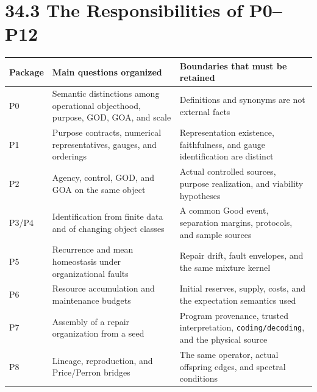 \documentclass[
  english,
  11pt,
  oneside]{book}
\newcounter{none} %
\begin{document}
\section{34.3 The Responsibilities of P0--P12}\label{the-responsibilities-of-p0p12}

{\def\LTcaptype{none} %
\begin{longtable}[]{@{}
  >{\raggedright\arraybackslash}p{}
  >{\raggedright\arraybackslash}p{}
  >{\raggedright\arraybackslash}p{}@{}}
\toprule\noalign{}
\begin{minipage}[b]{\linewidth}\raggedright
Package
\end{minipage} & \begin{minipage}[b]{\linewidth}\raggedright
Main questions organized
\end{minipage} & \begin{minipage}[b]{\linewidth}\raggedright
Boundaries that must be retained
\end{minipage} \\
\midrule\noalign{}
\endhead
\bottomrule\noalign{}
\endlastfoot
P0 & Semantic distinctions among operational objecthood, purpose, GOD, GOA, and scale & Definitions and synonyms are not external facts \\
P1 & Purpose contracts, numerical representatives, gauges, and orderings & Representation existence, faithfulness, and gauge identification are distinct \\
P2 & Agency, control, GOD, and GOA on the same object & Actual controlled sources, purpose realization, and viability hypotheses \\
P3/P4 & Identification from finite data and of changing object classes & A common Good event, separation margins, protocols, and sample sources \\
P5 & Recurrence and mean homeostasis under organizational faults & Repair drift, fault envelopes, and the same mixture kernel \\
P6 & Resource accumulation and maintenance budgets & Initial reserves, supply, costs, and the expectation semantics used \\
P7 & Assembly of a repair organization from a seed & Program provenance, trusted interpretation, \nolinkurl{coding/decoding}, and the physical source \\
P8 & Lineage, reproduction, and Price/Perron bridges & The same operator, actual offspring edges, and spectral conditions \\

\end{longtable}}
\end{document}
